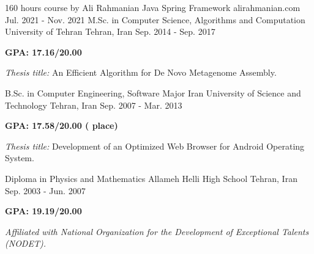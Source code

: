 
\begin{cventries}

  \cventry
    {160 hours course by Ali Rahmanian} %
    {Java Spring Framework} %
    {alirahmanian.com} %
    {Jul. 2021 - Nov. 2021} %
    { %
    }
  \vspace{-2mm}
  \cventry
    {M.Sc. in Computer Science, Algorithms and Computation} %
    {University of Tehran} %
    {Tehran, Iran} %
    {Sep. 2014 - Sep. 2017} %
    {
      \begin{cvitems}
        \item {\textbf{GPA: 17.16/20.00}}
        \item {\textit{Thesis title:} An Efficient Algorithm for De Novo Metagenome Assembly.}
      \end{cvitems}
    }
    
  \cventry
    {B.Sc. in Computer Engineering, Software Major} %
    {Iran University of Science and Technology} %
    {Tehran, Iran} %
    {Sep. 2007 - Mar. 2013} %
    {
      \begin{cvitems}
        \item {\textbf{GPA: 17.58/20.00 ( place)}}
        \item {\textit{Thesis title:} Development of an Optimized Web Browser for Android Operating System.}
      \end{cvitems}
    }

  \cventry
    {Diploma in Physics and Mathematics} %
    {Allameh Helli High School} %
    {Tehran, Iran} %
    {Sep. 2003 - Jun. 2007} %
    {
      \begin{cvitems}
        \item {\textbf{GPA: 19.19/20.00}}
        \item {\textit{Affiliated with National Organization for the Development of Exceptional Talents (NODET).}}
      \end{cvitems}
    }
    
\end{cventries}
